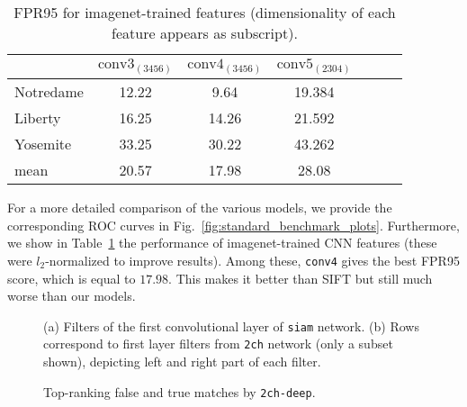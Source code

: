 \documentclass[10pt,twocolumn,letterpaper]{article}
\newcommand*{\USEIMAGES}{}
\begin{document}
\begin{table}

\begin{center}
\small
\begin{tabular}{lcccccc}
\hline
 & $\mathrm{conv3}_{(3456)}$  &   $\mathrm{conv4}_{(3456)}$  & $\mathrm{conv5}_{(2304)}$ \\ 
\hline
Notredame     & 12.22  & 9.64  & 19.384 \\
Liberty            & 16.25  & 14.26  & 21.592 \\
Yosemite        & 33.25  & 30.22  & 43.262 \\ \hline
mean  & 20.57  &17.98  &  28.08 \\
\hline
\end{tabular}
\small
\end{center}
\caption{FPR95 for imagenet-trained features (dimensionality of each feature appears as subscript).}
\label{standard_benchmark_imagenet}
\vspace{-10pt}
\end{table}

 
For a more detailed comparison of the various models, we  provide the corresponding ROC curves in Fig.~\ref{fig:standard_benchmark_plots}. Furthermore,  we show in Table~\ref{standard_benchmark_imagenet} the performance of imagenet-trained CNN features (these were $l_2$-normalized to improve results). Among these, \texttt{conv4} gives the best FPR95 score, which is equal to $17.98$. This makes it better than SIFT but still much worse than our models. 

\ifdefined\USEIMAGES
\begin{figure}[h]
\centering
{}\hspace{1cm}
\caption{(a) Filters of the first convolutional layer of \texttt{siam} network. (b) Rows correspond to  first layer filters from \texttt{2ch} network (only a subset shown), depicting left and right  part of each filter.}
\end{figure}
\vspace{-15pt}
\fi

\ifdefined\USEIMAGES
\begin{figure}[h]
\centering
{}
\caption{Top-ranking false and true matches by \texttt{2ch-deep}.}
\label{fig:false_true_matches}
\vspace{-5pt}
\end{figure}
\fi
\end{document}
